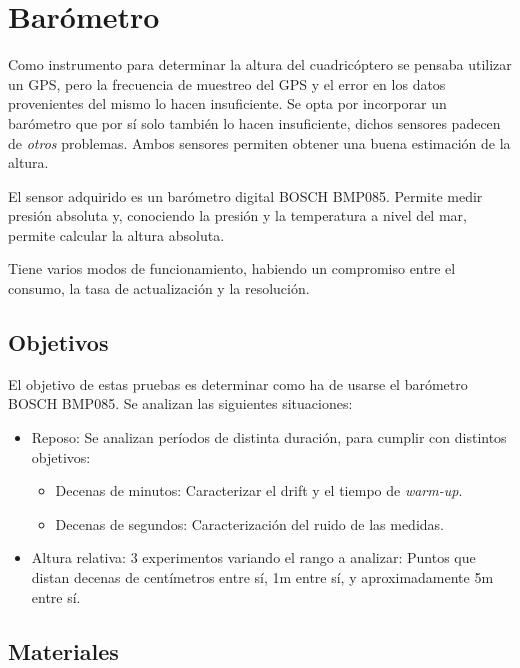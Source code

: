 \documentclass[main]{subfiles}
\begin{document}
\chapter{Bar\'ometro}
\label{chap:barometro}

Como instrumento para determinar la altura del cuadric\'optero se pensaba utilizar un GPS, pero la frecuencia de muestreo del GPS y el error en los datos provenientes del mismo lo hacen insuficiente. Se opta por incorporar un bar\'ometro que por sí solo también lo hacen insuficiente, dichos sensores padecen de \textit{otros} problemas. Ambos sensores permiten obtener una buena estimaci\'on de la altura.

El sensor adquirido es un bar\'ometro digital BOSCH BMP085. Permite medir presi\'on absoluta y, conociendo la presi\'on y la temperatura a nivel del mar, permite calcular la altura absoluta.

Tiene varios modos de funcionamiento, habiendo un compromiso entre el consumo, la tasa de actualizaci\'on y la resoluci\'on.

\section{Objetivos}

El objetivo de estas pruebas es determinar como ha de usarse el bar\'ometro BOSCH BMP085. Se analizan las siguientes situaciones:

\begin{itemize}
\item Reposo: Se analizan per\'iodos de distinta duraci\'on, para cumplir con distintos objetivos:
  \begin{itemize}
  \item Decenas de minutos: Caracterizar el drift y el tiempo de \textit{warm-up}.
  \item Decenas de segundos: Caracterizaci\'on del ruido de las medidas.
  \end{itemize}
\item Altura relativa: 3 experimentos variando el rango a analizar: Puntos que distan decenas de cent\'imetros entre s\'i, 1m entre s\'i, y aproximadamente 5m entre s\'i.
\end{itemize}

\newpage
\section{Materiales}
\label{sec:materiales}
\end{document}
